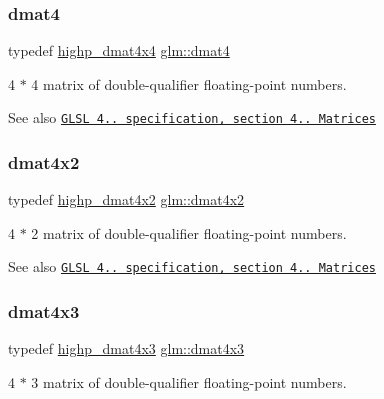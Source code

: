 \subsubsection{\texorpdfstring{dmat4}{dmat4}}
{\footnotesize\ttfamily typedef \mbox{\hyperlink{group__core__precision_gad3df38df8c4f7ef9b38f03581ff60142}{highp\+\_\+dmat4x4}} \mbox{\hyperlink{group__core__types_ga7f7c1300ebfd19d573e9deb1e8758b54}{glm\+::dmat4}}}

4 $\ast$ 4 matrix of double-\/qualifier floating-\/point numbers.

\begin{DoxySeeAlso}{See also}
\href{http://www.opengl.org/registry/doc/GLSLangSpec.4.20.8.pdf}{\tt G\+L\+SL 4.. specification, section 4.. Matrices} 
\end{DoxySeeAlso}
\mbox{\label{group__core__types_gab3d51ce41e6f0aa267d3e185cee09c44}} 
\subsubsection{\texorpdfstring{dmat4x2}{dmat4x2}}
{\footnotesize\ttfamily typedef \mbox{\hyperlink{group__core__precision_ga22c6b4fe5bb2e33a3cfa1c026803dd68}{highp\+\_\+dmat4x2}} \mbox{\hyperlink{group__core__types_gab3d51ce41e6f0aa267d3e185cee09c44}{glm\+::dmat4x2}}}

4 $\ast$ 2 matrix of double-\/qualifier floating-\/point numbers.

\begin{DoxySeeAlso}{See also}
\href{http://www.opengl.org/registry/doc/GLSLangSpec.4.20.8.pdf}{\tt G\+L\+SL 4.. specification, section 4.. Matrices} 
\end{DoxySeeAlso}
\mbox{\label{group__core__types_gaa4a157ac183c5bd5dcbd555a94b1b505}} 
\subsubsection{\texorpdfstring{dmat4x3}{dmat4x3}}
{\footnotesize\ttfamily typedef \mbox{\hyperlink{group__core__precision_ga9a5dab260df6e8c46c747bac0b8d2f38}{highp\+\_\+dmat4x3}} \mbox{\hyperlink{group__core__types_gaa4a157ac183c5bd5dcbd555a94b1b505}{glm\+::dmat4x3}}}

4 $\ast$ 3 matrix of double-\/qualifier floating-\/point numbers.

